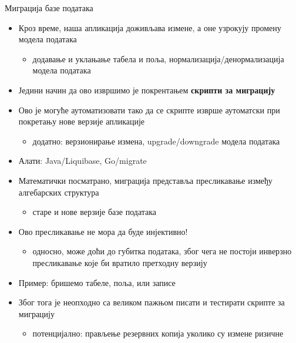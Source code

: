\documentclass{beamer}
\begin{document}
    \begin{frame}[allowframebreaks]{Миграција базе података}
        \begin{itemize}
            \item Кроз време, наша апликација доживљава измене, а оне узрокују промену модела података
            \begin{itemize}
                \item додавање и уклањање табела и поља, нормализација/денормализација модела података
            \end{itemize}
            \item Једини начин да ово извршимо је покрентањем \textbf{скрипти за миграцију}
            \item Ово је могуће аутоматизовати тако да се скрипте изврше аутоматски при покретању нове верзије апликације
            \begin{itemize}
                \item додатно: верзионирање измена, upgrade/downgrade модела података
            \end{itemize}
            \item Алати: Java/Liquibase, Go/migrate
        \end{itemize}
        
        \framebreak
        
        \begin{itemize}
            \item Математички посматрано, миграција представља пресликавање између алгебарских структура
            \begin{itemize}
                \item старе и нове верзије базе података
            \end{itemize}
            \item Ово пресликавање не мора да буде инјективно!
            \begin{itemize}
                \item односно, може доћи до губитка података, због чега не постоји инверзно пресликавање које би вратило претходну верзију
            \end{itemize}
            \item Пример: бришемо табеле, поља, или записе
            \item Због тога је неопходно са великом пажњом писати и тестирати скрипте за миграцију
            \begin{itemize}
                \item потенцијално: прављење резервних копија уколико су измене ризичне
            \end{itemize}
        \end{itemize}
        

\end{frame}
\end{document}
